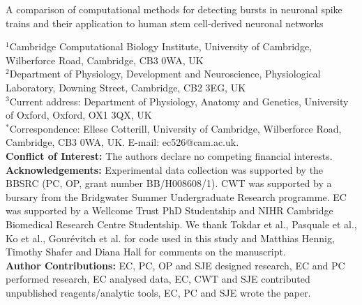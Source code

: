 \documentclass[12pt, titlepage]{article}
\begin{document}
	\begin{titlepage}
		\begin{center}
		
	
			{\LARGE   A comparison of computational methods for detecting bursts in neuronal spike trains and their application to human stem cell-derived neuronal networks}
			\\ 
			\end{center}
		\noindent$^1$Cambridge Computational Biology Institute, University of Cambridge, Wilberforce Road, Cambridge, CB3 0WA, UK
		\\$^2$Department of Physiology, Development and Neuroscience, Physiological Laboratory, Downing Street, Cambridge, CB2 3EG, UK
                \\$^3$Current address: Department of Physiology, Anatomy and Genetics, 
University of Oxford, Oxford, OX1 3QX, UK
		\\$^*$Correspondence: Ellese Cotterill, University of Cambridge, Wilberforce Road, Cambridge,
		CB3 0WA, UK. E-mail: ec526@cam.ac.uk.
		\bigskip \\ \textbf{Conflict of Interest:} The authors declare no competing financial interests.
		\bigskip \\ \textbf{Acknowledgements:} Experimental data collection was supported by the BBSRC (PC, OP, grant number BB/H008608/1). CWT was supported by a bursary from the Bridgwater Summer Undergraduate Research programme. EC was supported by a Wellcome Trust PhD Studentship and NIHR Cambridge Biomedical Research Centre Studentship. We thank Tokdar et al., Pasquale et al., Ko et al., Gour\'{e}vitch et al. for code used in this study and Matthias Hennig, Timothy Shafer and Diana Hall for comments on the manuscript. 
		\bigskip \\ \textbf{Author Contributions:} EC, PC, OP and SJE designed research, EC and PC performed research, EC analysed data, EC, CWT and SJE contributed unpublished reagents/analytic tools, EC, PC and SJE wrote the paper.
	\end{titlepage}
\end{document}
